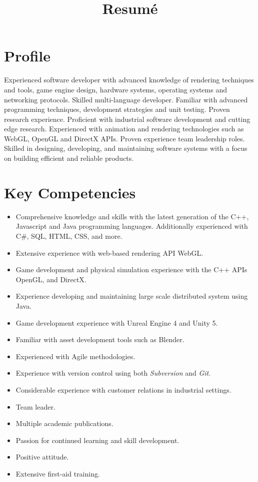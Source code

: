 \documentclass[11pt,a4paper,sans]{moderncv}        %
\title{Resumé}                               %
\begin{document}
\makecvtitle
\section{Profile}
Experienced software developer with advanced knowledge of rendering techniques and tools, game engine design, hardware systems, operating systems and networking protocols. 
Skilled multi-language developer. 
Familiar with advanced programming techniques, development strategies and unit testing.
Proven research experience. 
Proficient with industrial software development and cutting edge research.
Experienced with animation and rendering technologies such as WebGL, OpenGL and DirectX APIs. 
Proven experience team leadership roles.
Skilled in designing, developing, and maintaining software systems with a focus on building efficient and reliable products.
\section{Key Competencies}
\begin{itemize}
	\item Comprehensive knowledge and skills with the latest generation of the C++, Javascript and Java programming languages. Additionally experienced with C\#, SQL, HTML, CSS, and more.
	\item Extensive experience with web-based rendering API WebGL.
	\item Game development and physical simulation experience with the C++ APIs OpenGL, and DirectX.
	\item Experience developing and maintaining large scale distributed system using Java.
	\item Game development experience with Unreal Engine 4 and Unity 5.
	\item Familiar with asset development tools such as Blender.
	\item Experienced with Agile methodologies.
	\item Experience with version control using both \textit{Subversion} and \textit{Git}.
	\item Considerable experience with customer relations in industrial settings.
	\item Team leader.
	\item Multiple academic publications.
	\item Passion for continued learning and skill development.
	\item Positive attitude.
	\item Extensive first-aid training.
\end{itemize}
\end{document}
